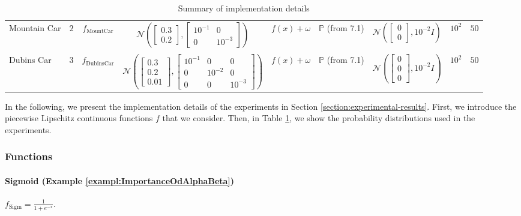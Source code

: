 \documentclass[11pt, a4paper, oneside,reqno]{amsart}
\theoremstyle{plain}
\def\prob{\mathbb{P}}
\def\sN{{\mathcal{N}}}
\begin{document}
\begin{table}[t]
{\begin{tabular}{lcccccccc}
    Mountain Car & $2$ & $f_{\text{MountCar}}$ & \multicolumn{1}{c|}{$\sN\left(\begin{bmatrix}0.3 \\0.2\end{bmatrix}, \begin{bmatrix}10^{-1} & 0 \\0 & 10^{-3}\end{bmatrix}\right)$} & $f(x) + \omega$ & $\prob$ (from 7.1) & $\sN\left(\begin{bmatrix}0 \\0\end{bmatrix}, 10^{-2}I\right)$ & $10^2$ & $50$ \\ \\
    Dubins Car & $3$ & $f_\text{DubinsCar}$ & \multicolumn{1}{c|}{$\sN\left(\begin{bmatrix}0.3 \\0.2\\0.01\end{bmatrix}, \begin{bmatrix}10^{-1} & 0 & 0 \\0 & 10^{-2} & 0\\ 0 & 0 & 10^{-3} \end{bmatrix}\right)$} & $f(x) + \omega$ & $\prob$ (from 7.1) & $\sN\left(\begin{bmatrix}0 \\0\\0\end{bmatrix}, 10^{-2}I\right)$ & $10^2$ & $50$ \\ \hline
\end{tabular}
 }
\caption{Summary of implementation details}
\label{table:details-summary}
\end{table}

In the following, we present the implementation details of the experiments in Section \ref{section:experimental-results}. First, we introduce the piecewise Lipschitz continuous functions $f$ that we consider. Then, in Table \ref{table:details-summary}, we show the probability distributions used in the experiments.

\subsubsection{Functions}\label{appendix:functions}
\paragraph{Sigmoid (Example \ref{exampl:ImportanceOdAlphaBeta})}$f_{\text{Sigm}} = \frac{1}{1+e^{-x}}.$
\end{document}
